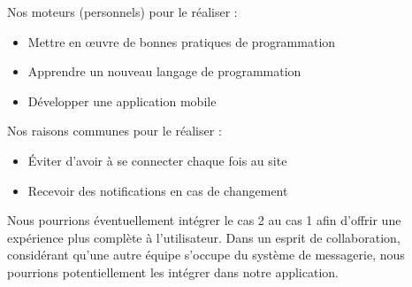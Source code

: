 		Nos moteurs (personnels) pour le réaliser : 
		\begin{itemize}
			\item Mettre en \oe uvre de bonnes pratiques de programmation
			\item Apprendre un nouveau langage de programmation
			\item Développer une application mobile
		\end{itemize}
		
		Nos raisons communes pour le réaliser :
		\begin{itemize}
			\item Éviter d'avoir à se connecter chaque fois au site
			\item Recevoir des notifications en cas de changement
		\end{itemize}
		
		Nous pourrions éventuellement intégrer le cas 2 au cas 1 afin d'offrir une expérience plus complète à l'utilisateur. Dans un esprit de collaboration, considérant qu'une autre équipe s'occupe du système de messagerie, nous pourrions potentiellement les intégrer dans notre application.
		